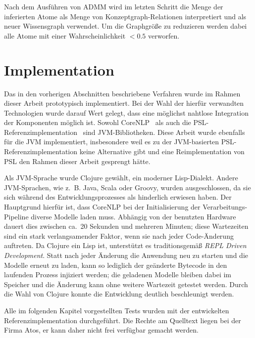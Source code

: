 Nach dem Ausführen von ADMM wird im letzten Schritt die Menge der inferierten Atome als Menge von Konzeptgraph-Relationen interpretiert und als neuer Wissensgraph verwendet.
Um die Graphgröße zu reduzieren werden dabei alle Atome mit einer Wahrscheinlichkeit $< 0.5$ verworfen.

\section{Implementation}%
\label{sec:text2kg:implementation}

Das in den vorherigen Abschnitten beschriebene Verfahren wurde im Rahmen dieser Arbeit prototypisch implementiert.
Bei der Wahl der hierfür verwandten Technologien wurde darauf Wert gelegt, dass eine möglichst nahtlose Integration der Komponenten möglich ist.
Sowohl CoreNLP~\cite{CoreNLP} als auch die PSL-Referenzimplementation~\cite{PSL} sind JVM-Bibliotheken.
Diese Arbeit wurde ebenfalls für die JVM implementiert, insbesondere weil es zu der JVM-basierten PSL-Referenzimplementation keine Alternative gibt und eine Reimplementation von PSL den Rahmen dieser Arbeit gesprengt hätte.

Als JVM-Sprache wurde Clojure gewählt, ein moderner Lisp-Dialekt.
Andere JVM-Sprachen, wie z.~B. Java, Scala oder Groovy, wurden ausgeschlossen, da sie sich während des Entwicklungsprozesses als hinderlich erwiesen haben.
Der Hauptgrund hierfür ist, dass CoreNLP bei der Initialisierung der Verarbeitungs-Pipeline diverse Modelle laden muss.
Abhängig von der benutzten Hardware dauert dies zwischen ca.\ 20 Sekunden und mehreren Minuten;
diese Wartezeiten sind ein stark verlangsamender Faktor, wenn sie nach jeder Code-Änderung auftreten.
Da Clojure ein Lisp ist, unterstützt es traditionsgemäß \textit{REPL Driven Development}.
Statt nach jeder Änderung die Anwendung neu zu starten und die Modelle erneut zu laden, kann so lediglich der geänderte Bytecode in den laufenden Prozess injiziert werden;
die geladenen Modelle bleiben dabei im Speicher und die Änderung kann ohne weitere Wartezeit getestet werden.
Durch die Wahl von Clojure konnte die Entwicklung deutlich beschleunigt werden.

Alle im folgenden Kapitel vorgestellten Tests wurden mit der entwickelten Referenzimplementation durchgeführt.
Die Rechte am Quelltext liegen bei der Firma Atos, er kann daher nicht frei verfügbar gemacht werden.

